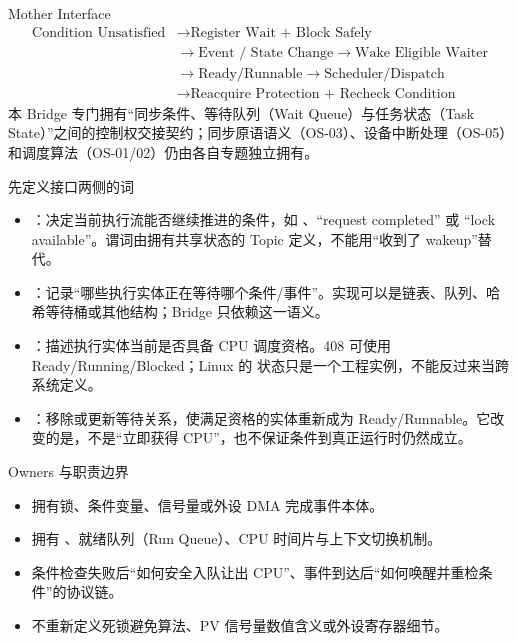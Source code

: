 \documentclass[UTF8,fontset=none,11pt,a4paper]{ctexart}
\begin{document}

\begin{corebox}{Mother Interface}
\[
\boxed{
\begin{aligned}
\text{Condition Unsatisfied} &\to \text{Register Wait + Block Safely} \\
&\to \text{Event / State Change} \to \text{Wake Eligible Waiter} \\
&\to \text{Ready/Runnable} \to \text{Scheduler/Dispatch} \\
&\to \text{Reacquire Protection + Recheck Condition}
\end{aligned}
}
\]
本 Bridge 专门拥有“同步条件、等待队列（Wait Queue）与任务状态（Task State）”之间的控制权交接契约；同步原语语义（OS-03）、设备中断处理（OS-05）和调度算法（OS-01/02）仍由各自专题独立拥有。
\end{corebox}

\begin{methodbox}{先定义接口两侧的词}
\begin{itemize}
  \item {}：决定当前执行流能否继续推进的条件，如 、``request completed'' 或 ``lock available''。谓词由拥有共享状态的 Topic 定义，不能用“收到了 wakeup”替代。
  \item {}：记录“哪些执行实体正在等待哪个条件/事件”。实现可以是链表、队列、哈希等待桶或其他结构；Bridge 只依赖这一语义。
  \item {}：描述执行实体当前是否具备 CPU 调度资格。408 可使用 Ready/Running/Blocked；Linux 的  状态只是一个工程实例，不能反过来当跨系统定义。
  \item {}：移除或更新等待关系，使满足资格的实体重新成为 Ready/Runnable。它改变的是，不是“立即获得 CPU”，也不保证条件到真正运行时仍然成立。
\end{itemize}
\end{methodbox}

\begin{methodbox}{Owners 与职责边界}
\begin{itemize}
  \item {}拥有锁、条件变量、信号量或外设 DMA 完成事件本体。
  \item {}拥有 、就绪队列（Run Queue）、CPU 时间片与上下文切换机制。
  \item {}条件检查失败后“如何安全入队让出 CPU”、事件到达后“如何唤醒并重检条件”的协议链。
  \item {}不重新定义死锁避免算法、PV 信号量数值含义或外设寄存器细节。
\end{itemize}
\end{methodbox}
\end{document}
